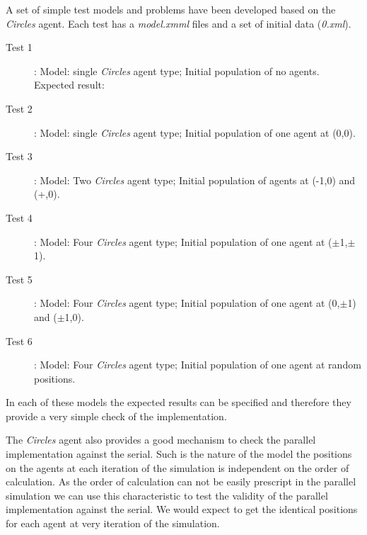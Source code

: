 A set of simple test models and problems have been developed based on the \textsl{Circles} agent. Each test has a \textsl{model.xmml} files and a set of initial data (\textsl{0.xml}).
\begin{description}
	\item [Test 1]: Model: single \textsl{Circles} agent type; Initial population of no agents. Expected result:
	\item [Test 2]: Model: single \textsl{Circles} agent type; Initial population of one agent at (0,0).
	\item [Test 3]: Model: Two \textsl{Circles} agent type; Initial population of agents at (-1,0) and (+,0).
	\item [Test 4]: Model: Four \textsl{Circles} agent type; Initial population of one agent at ($\pm$1,$\pm$1).
	\item [Test 5]: Model: Four \textsl{Circles} agent type; Initial population of one agent at (0,$\pm$1) and ($\pm$1,0).
	\item [Test 6]: Model: Four \textsl{Circles} agent type; Initial population of one agent at random positions.
	\end{description}
In each of these models the expected results can be specified and therefore they provide a very simple check of the implementation.

The \textsl{Circles} agent also provides a good mechanism to check the parallel implementation against the serial. Such is the nature of the model the positions on the agents at each iteration of the simulation is independent on the order of calculation. As the order of calculation can not be easily prescript in the parallel simulation we can use this characteristic to test the validity of the parallel implementation against the serial. We would expect to get the identical positions for each agent at very iteration of the simulation.

